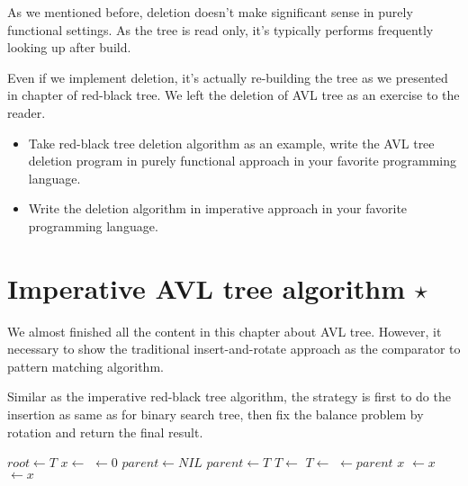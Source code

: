 \documentclass[UTF8]{article}
\begin{document}
As we mentioned before, deletion doesn't make significant sense in
purely functional settings. As the tree is read only, it's typically
performs frequently looking up after build.

Even if we implement deletion, it's actually re-building the tree
as we presented in chapter of red-black tree. We left the deletion
of AVL tree as an exercise to the reader.

\begin{Exercise}

\begin{itemize}

\item Take red-black tree deletion algorithm as an example, write the
AVL tree deletion program in purely functional approach in your
favorite programming language.

\item Write the deletion algorithm in imperative approach in your favorite
programming language.

\end{itemize}

\end{Exercise}

\section{Imperative AVL tree algorithm $\star$}

We almost finished all the content in this chapter about AVL tree.
However, it necessary to show the traditional insert-and-rotate
approach as the comparator to pattern matching algorithm.

Similar as the imperative red-black tree algorithm, the strategy
is first to do the insertion as same as for binary search tree,
then fix the balance problem by rotation and return the final result.

\begin{algorithmic}[1]
  \State $root \gets T$
  \State $x \gets$ 
  \State {} $\gets 0$
  \State $parent \gets NIL$
    \State $parent \gets T$
      \State $T \gets $ 
    \Else
      \State $T \gets $ 
    \EndIf
  \EndWhile
  \State {} $\gets parent$
   
    \State \Return $x$
    \State {} $\gets x$
  \Else
    \State {} $\gets x$
  \EndIf
  \State \Return {}
\EndFunction
\end{algorithmic}
\end{document}
